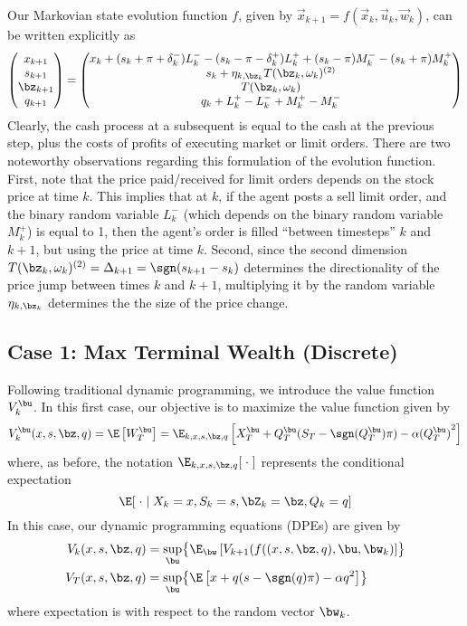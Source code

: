 \documentclass[12pt]{article}
\begin{document}
Our Markovian state evolution function $f$, given by $\vec{x}_{k+1} = f \left( \vec{x}_{k},\vec{u}_{k}, \vec{w}_{k} \right)$, can be written explicitly as
\begin{equation}
\label{eq:discretestateevolution}
\begin{pmatrix}
x_{k+1} \\
s_{k+1} \\
\bz_{k+1} \\
q_{k+1} 
\end{pmatrix} = \begin{pmatrix}
x_k + (s_k + \pi + \delta_k^-)L_k^- - (s_k - \pi - \delta_k^+)L_k^+ + (s_k - \pi)M_k^- - (s_k + \pi)M_k^+ \\
s_{k} + \eta_{k,\bz_k} T(\bz_k, \omega_k)^{(2)} \\
T(\bz_k, \omega_k) \\
q_{k} + L_k^+ - L_k^- + M_k^+ - M_k^-
\end{pmatrix}
\end{equation}
Clearly, the cash process at a subsequent is equal to the cash at the previous step, plus the costs of profits of executing market or limit orders. There are two noteworthy observations regarding this formulation of the evolution function. First, note that the price paid/received for limit orders depends on the stock price at time $k$. This implies that at $k$, if the agent posts a sell limit order, and the binary random variable $L_k^-$ (which depends on the binary random variable $M_k^+$) is equal to 1, then the agent's order is filled ``between timesteps'' $k$ and $k+1$, but using the price at time $k$. Second, since the second dimension $T(\bz_k, \omega_k)^{(2)} = \Delta_{k+1} = \sgn(s_{k+1} - s_k)$ determines the directionality of the price jump between times $k$ and $k+1$, multiplying it by the random variable $\eta_{k,\bz_k}$ determines the the size of the price change.

\subsection*{Case 1: Max Terminal Wealth (Discrete)}
Following traditional dynamic programming, we introduce the value function $V_k^{\bu}$. In this first case, our objective is to maximize the value function given by
\begin{equation}
V_k^{\bu} (x,s,\bz,q) = \E \left[ W_T^{\bu} \right] = \E_{k,x,s,\bz,q}\left[ X_T^{\bu} + Q_T^{\bu}(S_T - \sgn(Q_T^{\bu})\pi) - \alpha {(Q_T^{\bu})}^2 \right]
\end{equation}
where, as before, the notation $\E_{k,x,s,\bz,q}[ \; \cdot \; ]$ represents the conditional expectation
\[ \E [ \; \cdot \; | \; X_k = x, S_k = s, \bZ_k = \bz, Q_k = q] \]
In this case, our dynamic programming equations (DPEs) are given by
\begin{align}
V_k (x,s,\bz,q) & = \sup_{\bu} \bigl\lbrace \E_{\bw} \left[ V_{k+1} (f((x,s,\bz,q),\bu,\bw_k) \right] \bigr\rbrace \\
V_T (x,s,\bz,q) & = \sup_{\bu} \bigl\lbrace \E \left[ x + q(s-\sgn(q)\pi) - \alpha q^2 \right] \bigr\rbrace
\end{align}
where expectation is with respect to the random vector $\bw_k$.
\end{document}
